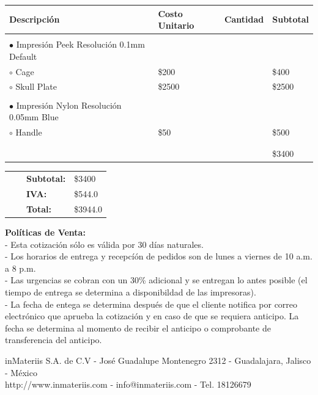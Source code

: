 \documentclass[11pt]{report}
\begin{document}
\begin{center}
\begin{tabular}{| >{\centering\arraybackslash}m{10cm} | >{\centering\arraybackslash}m{3cm} | >{\centering\arraybackslash}m{2cm} |  >{\centering\arraybackslash}m{2cm}|}
\hline
\textbf{Descripci\'on} & \textbf{Costo Unitario} & \textbf{Cantidad} & \textbf{Subtotal} \\
\hline
& & & \\
\item[$\bullet$] Impresi\'on Peek Resoluci\'on 0.1mm Default & & &\\
\item[$\circ$] Cage &\$200 &2 &\$400\\
\item[$\circ$] Skull Plate &\$2500 &1 &\$2500\\
& & & \\
\item[$\bullet$] Impresi\'on Nylon Resoluci\'on 0.05mm Blue & & &\\
\item[$\circ$] Handle &\$50 &10 &\$500\\
& & & \\
& & & \\
& & &\$3400 \\ 
\hline
\end{tabular}
\end{center} 
\begin{center}
\begin{tabular}{ >{\centering\arraybackslash}m{10cm}  >{\centering\arraybackslash}m{3cm}  >{\arraybackslash}m{2cm}   >{\arraybackslash}m{2cm}}
& &  \textbf{Subtotal:} &\$3400 \\
& &  \textbf{IVA:} &\$544.0\\
& &  \textbf{Total:} &\$3944.0\\
\end{tabular}
\end{center}
\mbox{}
\vfill
\scriptsize{
\textbf{Pol\'iticas de Venta:} \\
- Esta cotizaci\'on s\'olo es v\'alida por 30 d\'ias naturales.\\
- Los horarios de entrega y recepc\'i\'on de pedidos son de lunes a viernes de 10 a.m. a 8 p.m. \\
- Las urgencias se cobran con un 30\% adicional y se entregan lo antes posible (el tiempo de entrega se determina a disponibildad de las impresoras). \\
- La fecha de entega se determina despu\'es de que el cliente notifica por correo electr\'onico que aprueba la cotizaci\'on y en caso de que se requiera anticipo. La fecha se determina al momento de recibir el anticipo o comprobante de transferencia del anticipo. \\
\begin{center}
inMateriis S.A. de C.V - Jos\'e Guadalupe Montenegro 2312 - Guadalajara, Jalisco - M\'exico \\
http://www.inmateriis.com - info@inmateriis.com - Tel. 18126679
\end{center}
}
\end{document}
